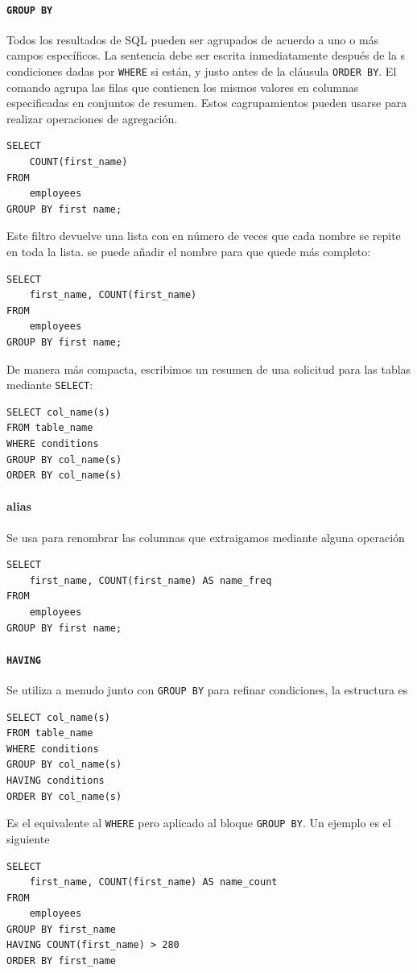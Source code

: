 \paragraph{\texttt{GROUP BY}} Todos los resultados de SQL pueden ser agrupados de acuerdo a uno o más campos específicos. La sentencia debe ser escrita inmediatamente después de la s condiciones dadas por  \texttt{WHERE} si están, y justo antes de la cláusula \texttt{ORDER BY}. El comando agrupa las filas que contienen los mismos valores en columnas especificadas en conjuntos de resumen. Estos cagrupamientos pueden usarse para realizar operaciones de agregación.
\begin{verbatim}
SELECT
    COUNT(first_name)
FROM
    employees
GROUP BY first name;
\end{verbatim}
Este filtro devuelve una lista con en número de veces que cada nombre se repite en toda la lista. se puede añadir el nombre para que quede más completo:
\begin{verbatim}
SELECT
    first_name, COUNT(first_name)
FROM
    employees
GROUP BY first name;
\end{verbatim}
De manera más compacta, escribimos un resumen de una solicitud para las tablas mediante \texttt{SELECT}:
\begin{verbatim}
SELECT col_name(s)
FROM table_name
WHERE conditions
GROUP BY col_name(s)
ORDER BY col_name(s)
\end{verbatim}
\paragraph{alias} Se usa para renombrar las columnas que extraigamos mediante alguna operación
\begin{verbatim}
SELECT
    first_name, COUNT(first_name) AS name_freq
FROM
    employees
GROUP BY first name;
\end{verbatim}
\paragraph{\texttt{HAVING}} Se utiliza a menudo junto con \texttt{GROUP BY} para refinar condiciones, la estructura es 
\begin{verbatim}
SELECT col_name(s)
FROM table_name
WHERE conditions
GROUP BY col_name(s)
HAVING conditions
ORDER BY col_name(s)
\end{verbatim}
Es el equivalente al \texttt{WHERE} pero aplicado al bloque \texttt{GROUP BY}.  Un ejemplo es el siguiente

\begin{verbatim}
SELECT 
    first_name, COUNT(first_name) AS name_count
FROM
    employees
GROUP BY first_name
HAVING COUNT(first_name) > 280
ORDER BY first_name
\end{verbatim}

